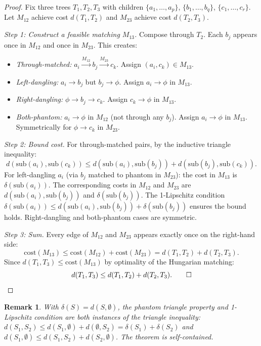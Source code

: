 \documentclass[11pt]{article}
\newtheorem{remark}[theorem]{Remark}
\newcommand{\sub}{\mathrm{sub}}
\newcommand{\cost}{\mathrm{cost}}
\begin{document}
\begin{proof}
Fix three trees $T_1, T_2, T_3$ with children $\{a_1, \ldots, a_p\}$,
$\{b_1, \ldots, b_q\}$, $\{c_1, \ldots, c_r\}$. Let $M_{12}$ achieve
cost $d(T_1, T_2)$ and $M_{23}$ achieve cost $d(T_2, T_3)$.

\emph{Step 1: Construct a feasible matching $M_{13}$.} Compose through
$T_2$. Each $b_j$ appears once in $M_{12}$ and once in $M_{23}$. This
creates:
\begin{itemize}[nosep]
  \item \emph{Through-matched:} $a_i \xrightarrow{M_{12}} b_j
    \xrightarrow{M_{23}} c_k$. Assign $(a_i, c_k) \in M_{13}$.
  \item \emph{Left-dangling:} $a_i \to b_j$ but $b_j \to \phi$. Assign
    $a_i \to \phi$ in $M_{13}$.
  \item \emph{Right-dangling:} $\phi \to b_j \to c_k$. Assign $c_k \to
    \phi$ in $M_{13}$.
  \item \emph{Both-phantom:} $a_i \to \phi$ in $M_{12}$ (not through
    any $b_j$). Assign $a_i \to \phi$ in $M_{13}$. Symmetrically for
    $\phi \to c_k$ in $M_{23}$.
\end{itemize}

\emph{Step 2: Bound cost.} For through-matched pairs, by the inductive
triangle inequality:
\[
  d(\sub(a_i), \sub(c_k)) \le d(\sub(a_i), \sub(b_j)) + d(\sub(b_j),
  \sub(c_k)).
\]
For left-dangling $a_i$ (via $b_j$ matched to phantom in $M_{23}$): the
cost in $M_{13}$ is $\delta(\sub(a_i))$. The corresponding costs in
$M_{12}$ and $M_{23}$ are $d(\sub(a_i), \sub(b_j))$ and
$\delta(\sub(b_j))$. The 1-Lipschitz condition $\delta(\sub(a_i)) \le
d(\sub(a_i), \sub(b_j)) + \delta(\sub(b_j))$ ensures the bound holds.
Right-dangling and both-phantom cases are symmetric.

\emph{Step 3: Sum.} Every edge of $M_{12}$ and $M_{23}$ appears exactly
once on the right-hand side:
\[
  \cost(M_{13}) \le \cost(M_{12}) + \cost(M_{23}) = d(T_1, T_2) +
  d(T_2, T_3).
\]
Since $d(T_1, T_3) \le \cost(M_{13})$ by optimality of the Hungarian
matching:
\[
  d(T_1, T_3) \le d(T_1, T_2) + d(T_2, T_3). \qed
\]
\end{proof}

\begin{remark}
With $\delta(S) = d(S, \emptyset)$, the phantom triangle property and
1-Lipschitz condition are both instances of the triangle inequality:
$d(S_1, S_2) \le d(S_1, \emptyset) + d(\emptyset, S_2) = \delta(S_1) +
\delta(S_2)$ and $d(S_1, \emptyset) \le d(S_1, S_2) + d(S_2,
\emptyset)$. The theorem is self-contained.
\end{remark}
\end{document}
